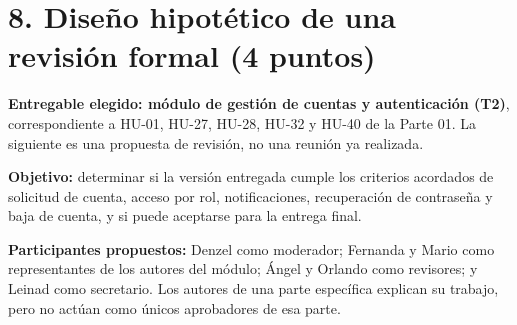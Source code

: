 \documentclass[11pt,letterpaper]{article}
\begin{document}
\section*{8. Diseño hipotético de una revisión formal (4 puntos)}
\textbf{Entregable elegido: módulo de gestión de cuentas y autenticación
(T2)}, correspondiente a HU-01, HU-27, HU-28, HU-32 y HU-40 de la Parte 01.
La siguiente es una propuesta de revisión, no una reunión ya realizada.

\textbf{Objetivo:} determinar si la versión entregada cumple los criterios
acordados de solicitud de cuenta, acceso por rol, notificaciones, recuperación
de contraseña y baja de cuenta, y si puede aceptarse para la entrega final.

\textbf{Participantes propuestos:} Denzel como moderador; Fernanda y Mario
como representantes de los autores del módulo; Ángel y Orlando como
revisores; y Leinad como secretario. Los autores de una parte específica
explican su trabajo, pero no actúan como únicos aprobadores de esa parte.
\end{document}
